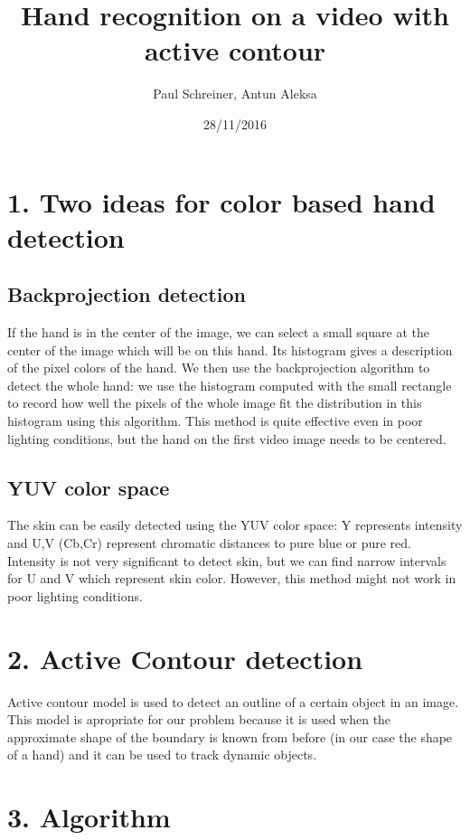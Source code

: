 \documentclass{report}
\title{Hand recognition on a video with active contour}
\author{Paul Schreiner, Antun Aleksa}
\date{28/11/2016}
\begin{document}
\maketitle



\section*{1. Two ideas for color based hand detection}

\subsection*{Backprojection detection}

If the hand is in the center of the image, we can select a small square at the center of the image which will be on this hand. Its histogram gives a description of the pixel colors of the hand. We then use the backprojection algorithm to detect the whole hand: we use the histogram computed with the small rectangle to record how well the pixels of the whole image fit the distribution in this histogram using this algorithm. This method is quite effective even in poor lighting conditions, but the hand on the first video image needs to be centered. 

\subsection*{YUV color space}

The skin can be easily detected using the YUV color space: Y represents intensity and U,V (Cb,Cr) represent chromatic distances to pure blue or pure red. Intensity is not very significant to detect skin, but we can find narrow intervals for U and V which represent skin color. However, this method might not work in poor lighting conditions. 



\section*{2. Active Contour detection}

Active contour model is used to detect an outline of a certain object in an image. This model is apropriate for our problem because it is used when the approximate shape of the boundary is known from before (in our case the shape of a hand) and it can be used to track dynamic objects. 

\section*{3. Algorithm}
\end{document}
